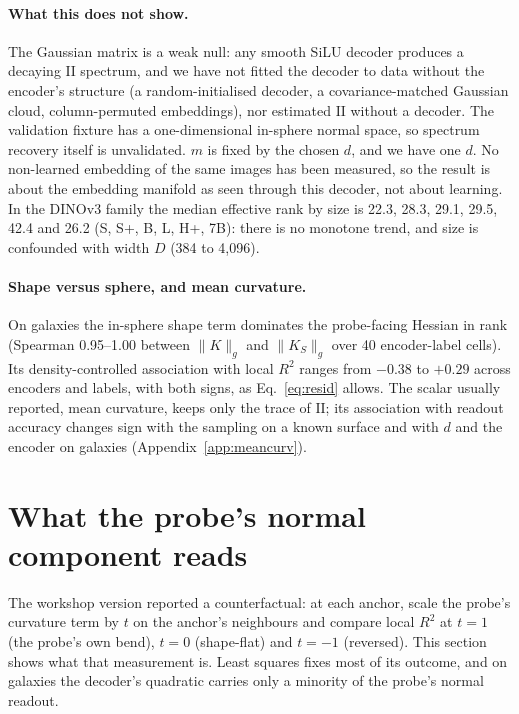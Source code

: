 \documentclass[10pt]{article}
\newcommand{\norm}[1]{\lVert #1 \rVert}
\newcommand{\II}{\mathrm{II}}
\begin{document}
\paragraph{What this does not show.} The Gaussian matrix is a weak null: any smooth SiLU decoder produces a decaying $\II$ spectrum, and we have not fitted the decoder to data without the encoder's structure (a random-initialised decoder, a covariance-matched Gaussian cloud, column-permuted embeddings), nor estimated $\II$ without a decoder. The validation fixture has a one-dimensional in-sphere normal space, so spectrum recovery itself is unvalidated. $m$ is fixed by the chosen $d$, and we have one $d$. No non-learned embedding of the same images has been measured, so the result is about the embedding manifold as seen through this decoder, not about learning. In the DINOv3 family the median effective rank by size is 22.3, 28.3, 29.1, 29.5, 42.4 and 26.2 (S, S+, B, L, H+, 7B): there is no monotone trend, and size is confounded with width $D$ (384 to 4{,}096). %

\paragraph{Shape versus sphere, and mean curvature.} On galaxies the in-sphere shape term dominates the probe-facing Hessian in rank (Spearman 0.95--1.00 between $\norm{K}_g$ and $\norm{K_S}_g$ over 40 encoder-label cells). %
Its density-controlled association with local $R^2$ ranges from $-0.38$ to $+0.29$ across encoders and labels, with both signs, as Eq.~\eqref{eq:resid} allows. %
The scalar usually reported, mean curvature, keeps only the trace of $\II$; its association with readout accuracy changes sign with the sampling on a known surface and with $d$ and the encoder on galaxies (Appendix~\ref{app:meancurv}).

\section{What the probe's normal component reads}
\label{sec:normal}

The workshop version reported a counterfactual: at each anchor, scale the probe's curvature term by $t$ on the anchor's neighbours and compare local $R^2$ at $t=1$ (the probe's own bend), $t=0$ (shape-flat) and $t=-1$ (reversed). This section shows what that measurement is. Least squares fixes most of its outcome, and on galaxies the decoder's quadratic carries only a minority of the probe's normal readout.
\end{document}
